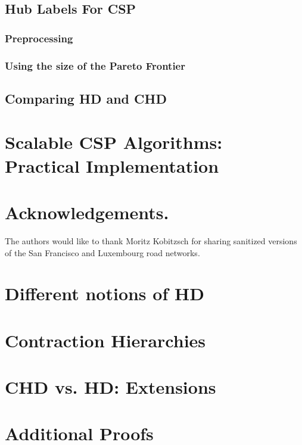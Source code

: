 \documentclass[format=acmsmall, screen=true]{acmart}
\begin{document}
\subsection{Hub Labels For CSP}
\label{ssec:hlcsp}


\subsubsection{Preprocessing}
\label{sec:preproc}


\subsubsection{Using the size of the Pareto Frontier}


\subsection{Comparing HD and CHD}
\label{ssec:hdvschd}


\section{Scalable CSP Algorithms: \texorpdfstring{\\}{ } Practical Implementation}
\label{sec:numeric}



\section*{Acknowledgements.}
The authors would like to thank Moritz Kobitzsch for sharing sanitized versions of the San Francisco and Luxembourg road networks.


\appendix
\section{Different notions of HD}
\label{app:generalhd}


\section{Contraction Hierarchies}


\section{CHD vs. HD: Extensions}
\label{app:extn}



\section{Additional Proofs}
\label{sec:proofs}




\end{document}

